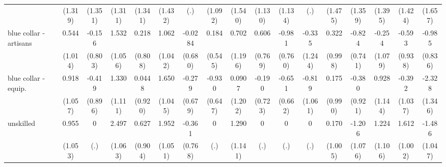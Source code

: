{\begin{tabular}{l*{16}{c}}
                    &     (1.319)         &     (1.351)         &     (1.311)         &     (1.341)         &     (1.432)         &         (.)         &     (1.092)         &     (1.540)         &     (1.130)         &     (1.134)         &         (.)         &     (1.475)         &     (1.359)         &     (1.395)         &     (1.424)         &     (1.657)         \\
[1em]
blue collar - artisans&       0.544         &      -0.156         &       1.532         &       0.218         &       1.062         &     -0.0284         &       0.184         &       0.702         &       0.606         &      -0.981         &      -0.335         &       0.322         &      -0.824         &      -0.254         &      -0.593         &      -0.985         \\
                    &     (1.014)         &     (0.803)         &     (1.056)         &     (0.808)         &     (1.042)         &     (0.680)         &     (0.545)         &     (1.196)         &     (0.769)         &     (0.760)         &     (1.244)         &     (0.998)         &     (0.741)         &     (1.079)         &     (0.938)         &     (0.836)         \\
[1em]
blue collar - equip.&       0.918         &      -0.419         &       1.330         &      0.0448         &       1.650         &      -0.279         &      -0.930         &      0.0907         &      -0.190         &      -0.651         &      -0.819         &       0.175         &      -0.380         &       0.928         &      -0.392         &      -2.328         \\
                    &     (1.057)         &     (0.896)         &     (1.111)         &     (0.920)         &     (1.045)         &     (0.679)         &     (0.647)         &     (1.202)         &     (0.723)         &     (0.662)         &     (1.061)         &     (0.990)         &     (0.921)         &     (1.144)         &     (1.037)         &     (1.346)         \\
[1em]
unskilled           &       0.955         &           0         &       2.497\sym{*}  &       0.627         &       1.952         &      -0.361         &           0         &       1.290         &           0         &           0         &           0         &       0.170         &      -1.206         &       1.224         &       1.612         &      -1.486         \\
                    &     (1.053)         &         (.)         &     (1.063)         &     (0.904)         &     (1.051)         &     (0.768)         &         (.)         &     (1.141)         &         (.)         &         (.)         &         (.)         &     (1.005)         &     (1.076)         &     (1.106)         &     (1.002)         &     (1.047)         \\

\end{tabular}}

